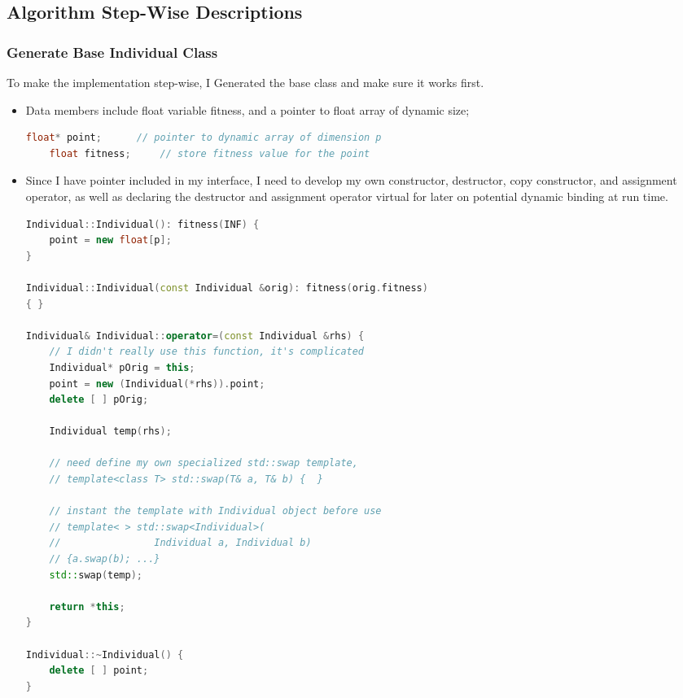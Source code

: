 \documentclass{article}
\begin{document}
\begin{CJK}{UTF8}{gbsn}
\subsection{Algorithm Step-Wise Descriptions}

\subsubsection{Generate Base Individual Class}
To make the implementation step-wise, I Generated the base class and make sure it works first.
\begin{itemize}
  \itemsep=-3pt

\item Data members include float variable fitness, and a pointer to float array of dynamic size;
\begin{lstlisting}[language=c++]
    float* point;      // pointer to dynamic array of dimension p
    float fitness;     // store fitness value for the point
\end{lstlisting}

\item Since I have pointer included in my interface, I need to develop my own constructor, destructor, copy constructor, and assignment operator, as well as declaring the destructor and assignment operator virtual for later on potential dynamic binding at run time. 
\begin{lstlisting}[language=c++]
Individual::Individual(): fitness(INF) {
    point = new float[p];
}

Individual::Individual(const Individual &orig): fitness(orig.fitness)
{ }

Individual& Individual::operator=(const Individual &rhs) {
    // I didn't really use this function, it's complicated
    Individual* pOrig = this;
    point = new (Individual(*rhs)).point;
    delete [ ] pOrig;

    Individual temp(rhs);

    // need define my own specialized std::swap template,
    // template<class T> std::swap(T& a, T& b) {  }
      
    // instant the template with Individual object before use
    // template< > std::swap<Individual>(
    //	              Individual a, Individual b)
    // {a.swap(b); ...}
    std::swap(temp);
      
    return *this;
}

Individual::~Individual() {
    delete [ ] point;
}
\end{lstlisting}


\end{itemize}
\end{CJK}
\end{document}
